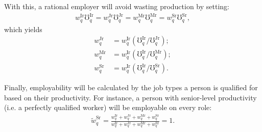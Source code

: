 \documentclass[hidelinks, nonatbib]{elsarticle}
\begin{document}
\begin{enumerate}
    With this, a rational employer will avoid wasting production by setting:
    \begin{gather}
        w_{q}^{\text{Ir}} \mho_{q}^{\text{Ir}} =
        w_{q}^{\text{Jr}} \mho_{q}^{\text{Jr}} =
        w_{q}^{\text{Mr}} \mho_{q}^{\text{Mr}} =
        w_{q}^{\text{Sr}} \mho_{q}^{\text{Sr}}
        , 
    \end{gather}
    which yields
    \begin{align}
        w_{q}^{\text{Jr}} &= 
        w_{q}^{\text{Ir}} 
        (
            \mho_{q}^{\text{Ir}} / 
            \mho_{q}^{\text{Jr}}
        )
        ;\\
        w_{q}^{\text{Mr}} &=
        w_{q}^{\text{Ir}} 
        (
            \mho_{q}^{\text{Ir}} / 
            \mho_{q}^{\text{Mr}}
        )
        ;\\
        w_{q}^{\text{Sr}} &=
        w_{q}^{\text{Ir}} 
        (
            \mho_{q}^{\text{Ir}} / 
            \mho_{q}^{\text{Sr}}
        )
        .
    \end{align}

    Finally, employability will be calculated by the job types a person is qualified for based on their productivity. For instance, a person with senior-level productivity (i.e. a perfectly qualified worker) will be employable on every role:
    \begin{gather}
        \tilde{w}_{q}^{\text{Sr}} = 
        \frac{
            w_{q}^{\text{Ir}} +
            w_{q}^{\text{Jr}} +
            w_{q}^{\text{Mr}} +
            w_{q}^{\text{Sr}}
        }{
            w_{q}^{\text{Ir}} +
            w_{q}^{\text{Jr}} +
            w_{q}^{\text{Mr}} +
            w_{q}^{\text{Sr}}
        } 
        = 1.
    \end{gather}


\end{enumerate}
\end{document}
